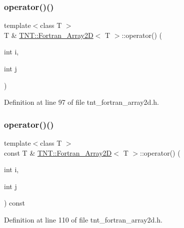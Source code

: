 \subsubsection{\texorpdfstring{operator()()}{operator()()}\hspace{0.1cm}{\footnotesize\ttfamily [1/2]}}
{\footnotesize\ttfamily template$<$class T $>$ \\
T \& \hyperlink{classTNT_1_1Fortran__Array2D}{T\+N\+T\+::\+Fortran\+\_\+\+Array2D}$<$ T $>$\+::operator() (\begin{DoxyParamCaption}\item[{int}]{i,  }\item[{int}]{j }\end{DoxyParamCaption})\hspace{0.3cm}{\ttfamily [inline]}}



Definition at line 97 of file tnt\+\_\+fortran\+\_\+array2d.\+h.

\mbox{\label{classTNT_1_1Fortran__Array2D_add7274a47eff2f7d458eb89d8b715493}} 
\subsubsection{\texorpdfstring{operator()()}{operator()()}\hspace{0.1cm}{\footnotesize\ttfamily [2/2]}}
{\footnotesize\ttfamily template$<$class T $>$ \\
const T \& \hyperlink{classTNT_1_1Fortran__Array2D}{T\+N\+T\+::\+Fortran\+\_\+\+Array2D}$<$ T $>$\+::operator() (\begin{DoxyParamCaption}\item[{int}]{i,  }\item[{int}]{j }\end{DoxyParamCaption}) const\hspace{0.3cm}{\ttfamily [inline]}}



Definition at line 110 of file tnt\+\_\+fortran\+\_\+array2d.\+h.

\mbox{\label{classTNT_1_1Fortran__Array2D_ae9d02fc21095e4cd2fff9f479d52a2b4}} 
